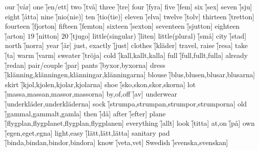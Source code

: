 \begin{questions}
    \begin{multicols}{3}
        \raggedcolumns
        \question our \f[vår]
        \question one \f[en/ett]
        \question two \f[två]
        \question three \f[tre]
        \question four \f[fyra]
        \question five \f[fem]
        \question six \f[sex]
        \question seven \f[sju]
        \question eight \f[åtta]
        \question nine \f[nio(nie)]
        \question ten \f[tio(tie)]
        \question eleven \f[elva]
        \question twelve \f[tolv]
        \question thirteen \f[tretton]
        \question fourteen \f[fjorton]
        \question fifteen \f[femton]
        \question sixteen \f[sexton]
        \question seventeen \f[sjutton]
        \question eighteen \f[arton]
        \question $19$ \f[nitton]
        \question $20$ \f[tjugo]
        \question little(singular) \f[liten]
        \question little(plural) \f[små]
        \question city \f[stad]
        \question north \f[norra]
        \question year \f[år]
        \question just, exactly \f[just]
        \question clothes \f[kläder]
        \question travel, raise \f[resa]
        \question take \f[ta]
        \question warm  \f[varm]
        \question sweater \f[tröja]
        \question cold \f[kall,kallt,kalla]
        \question full \f[full,fullt,fulla]
        \question already \f[redan]
        \question pair/couple \f[par]
        \question pants \f[byxor,byxorna]
        \question dress \f[klänning,klänningen,klänningar,klänningarna]
        \question blouse \f[blus,blusen,blusar,blusarna]
        \question skirt \f[kjol,kjolen,kjolar,kjolarna]
        \question shoe \f[sko,skon,skor,skorna]
        \question lot \f[massa,massan,massor,massorna]
        \question by,of,off \f[av]
        \question underwear \f[underkläder,underkläderna]
        \question sock \f[strumpa,strumpan,strumpor,strumporna]
        \question old \f[gammal,gammalt,gamla]
        \question then \f[då]
        \question after \f[efter]
        \question plane \f[flygplan,flygplanet,flygplan,flygplanen]
        \question everything \f[allt]
        \question look \f[titta]
        \question at,on \f[på]
        \question own \f[egen,eget,egna]
        \question light,easy \f[lätt,lätt,lätta]
        \question sanitary pad \f[binda,bindan,bindor,bindora]
        \question know \f[veta,vet]
        \question Swedish \f[svenska,svenskan]
    \end{multicols}
\end{questions}